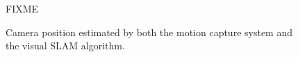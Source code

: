 
\begin{figure}[ht!]
  \begin{center}
    FIXME
  \end{center}
  \caption{Camera position estimated by both the motion capture system
    and the visual SLAM algorithm. \label{tab:mocap_comparison}}
\end{figure}


